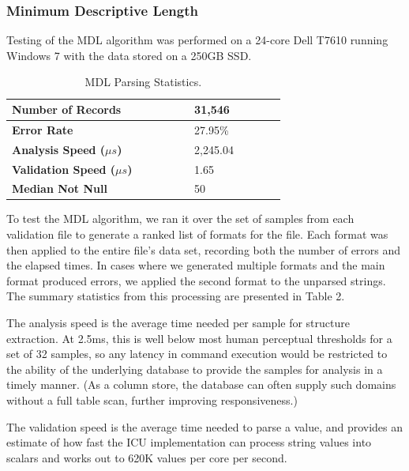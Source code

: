 \subsubsection{Minimum Descriptive Length}
Testing of the MDL algorithm was performed on a 24-core Dell T7610 running Windows 7 with the data stored on a 250GB SSD.

\begin{table}[ht]
\centering
\begin{tabular}{|p{0.48\linewidth}| p{0.24\linewidth}|}
\hline
\textbf{Number of Records} & 31,546\\ \hline
\textbf{Error Rate} & 27.95\% \\ \hline
\textbf{Analysis Speed ($\mu s$)} & 2,245.04 \\ \hline
\textbf{Validation Speed ($\mu s$)} & 1.65 \\ \hline
\textbf{Median Not Null} & 50 \\ \hline
\end{tabular}
\label{tab:mdlstats}
\caption{MDL Parsing Statistics.}
\end{table}

To test the MDL algorithm, we ran it over the set of samples from each validation file to generate a ranked list of formats for the file. Each format was then applied to the entire file's data set, recording both the number of errors and the elapsed times. In cases where we generated multiple formats and the main format produced errors, we applied the second format to the unparsed strings. The summary statistics from this processing are presented in Table 2.

The analysis speed is the average time needed per sample for structure extraction. At 2.5ms, this is well below most human perceptual thresholds for a set of 32 samples, so any latency in command execution would be restricted to the ability of the underlying database to provide the samples for analysis in a timely manner. (As a column store, the database can often supply such domains without a full table scan, further improving responsiveness.) 

The validation speed is the average time needed to parse a value, and provides an estimate of how fast the ICU implementation can process string values into scalars and works out to 620K values per core per second.\\
 
